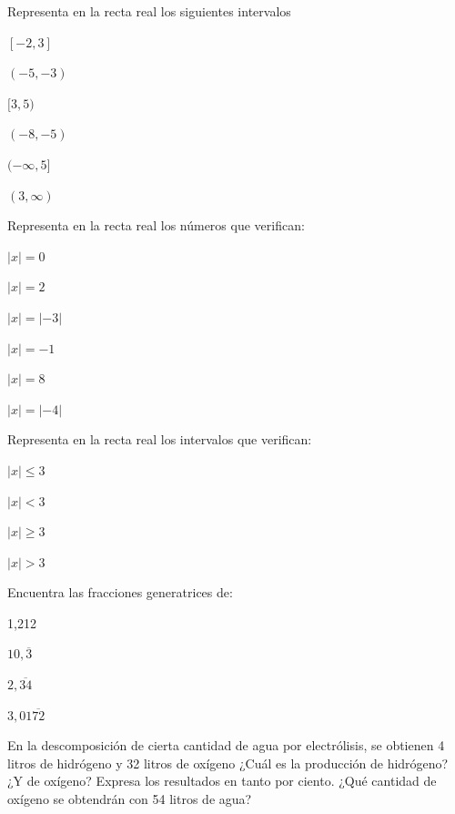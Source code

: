 \documentclass[letterpaper,10pt,twoside]{article}
\begin{document}
\begin{enumerate}
\begin{multicols}{2}
  \item Representa en la recta real los siguientes intervalos
  \begin{enumerate}\begin{multicols}{2}
    \item $ [-2,3] $    \item $ (-5,-3) $\item $ [3,5) $
    \item $ (-8,-5) $ \item $ (-\infty,5] $ \item $ (3,\infty) $
  \end{multicols}
  \end{enumerate}
  \item Representa en la recta real los números que verifican:
  \begin{enumerate}\begin{multicols}{3}
    \item $ |x|=0 $    \item $ |x|=2 $ \item $ |x|=|-3| $
    \item $ |x|=-1 $ \item $ |x|=8 $ \item $ |x|=|-4| $
  \end{multicols}
  \end{enumerate}
  \item Representa en la recta real los intervalos que verifican:
  \begin{enumerate}\begin{multicols}{3}
    \item $ |x|\leq 3 $    \item $ |x|<3 $
    \item $ |x|\geq 3 $ \item $ |x|>3 $
  \end{multicols}
  \end{enumerate}
  \item Encuentra las fracciones generatrices de:
  \begin{enumerate}\begin{multicols}{4}
    \item 1,212 \item $ 10,\overline{3} $
    \item $ 2,\overline{34} $ \item $ 3,01\overline{72} $    
  \end{multicols}
  \end{enumerate}
  \item En la descomposición de cierta cantidad de agua por electrólisis, se obtienen 4 litros de hidrógeno y 32 litros de oxígeno ¿Cuál es la producción de hidrógeno? ¿Y de oxígeno? Expresa los resultados en tanto por ciento. ¿Qué cantidad de oxígeno se obtendrán con 54 litros de agua?

\end{multicols}
\end{enumerate}
\end{document}
